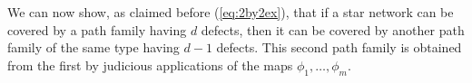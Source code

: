 \documentclass[12pt]{amsart}
\newtheorem{cor}[thm]{Corollary}
\theoremstyle{definition}
\numberwithin{equation}{section}
\newcommand{\sn}{\mathfrak{S}_n}
\newcommand{\ctr}[1]{{x}_{#1}}
\newcommand{\cnet}[1]{\mathcal F^\bullet_{#1}}
\begin{document}

We can now show, as claimed before (\ref{eq:2by2ex}), that if a star network can be covered by a path family having
$d$ defects, then it can be covered by another path family of the same
type having $d-1$ defects.
This second path family is obtained from the first by judicious applications of the maps $\phi_1,\dotsc,\phi_m$.


\end{document}
